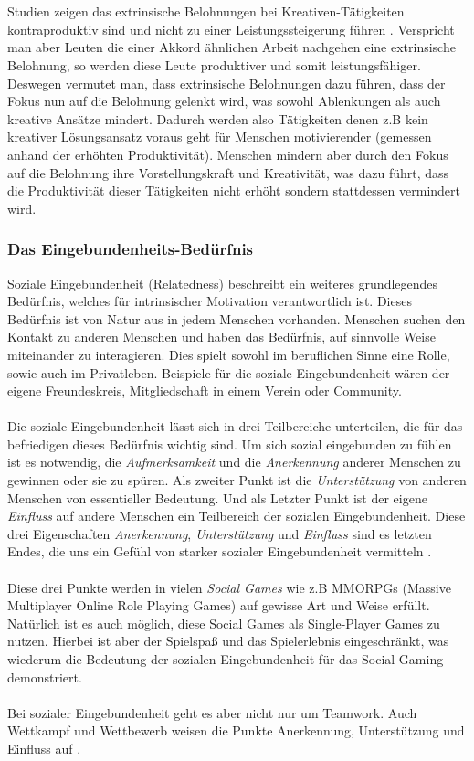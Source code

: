 \documentclass[a4paper,12pt]{scrartcl}
\begin{document}
\\\\
Studien zeigen das extrinsische Belohnungen bei Kreativen-Tätigkeiten kontraproduktiv sind und nicht zu einer Leistungssteigerung führen \cite{Pink2010}. Verspricht man aber Leuten die einer Akkord ähnlichen Arbeit nachgehen eine extrinsische Belohnung, so werden diese Leute produktiver und somit leistungsfähiger. Deswegen vermutet man, dass extrinsische Belohnungen dazu führen, dass der Fokus nun auf die Belohnung gelenkt wird, was sowohl Ablenkungen als auch kreative Ansätze mindert. Dadurch werden also Tätigkeiten denen z.B kein kreativer Lösungsansatz voraus geht für Menschen motivierender (gemessen anhand der erhöhten Produktivität). Menschen mindern aber durch den Fokus auf die Belohnung ihre Vorstellungskraft und Kreativität, was dazu führt, dass die Produktivität dieser Tätigkeiten nicht erhöht sondern stattdessen vermindert wird.

\subsubsection{Das Eingebundenheits-Bedürfnis}
Soziale Eingebundenheit (Relatedness) beschreibt ein weiteres grundlegendes Bedürfnis, welches für intrinsischer Motivation verantwortlich ist. Dieses Bedürfnis ist von Natur aus in jedem Menschen vorhanden. Menschen suchen den Kontakt zu anderen Menschen und haben das Bedürfnis, auf sinnvolle Weise miteinander zu interagieren. Dies spielt sowohl im beruflichen Sinne eine Rolle, sowie auch im Privatleben. Beispiele für die soziale Eingebundenheit wären der eigene Freundeskreis, Mitgliedschaft in einem Verein oder Community. 
\\\\
Die soziale Eingebundenheit lässt sich in drei Teilbereiche unterteilen, die für das befriedigen dieses Bedürfnis wichtig sind. Um sich sozial eingebunden zu fühlen ist es notwendig, die \textit{Aufmerksamkeit} und die \textit{Anerkennung} anderer Menschen zu gewinnen oder sie zu spüren. Als zweiter Punkt ist die \textit{Unterstützung} von anderen Menschen von essentieller Bedeutung. Und als Letzter Punkt ist der eigene \textit{Einfluss} auf andere Menschen ein Teilbereich der sozialen Eingebundenheit. Diese drei Eigenschaften \textit{Anerkennung}, \textit{Unterstützung} und \textit{Einfluss} sind es letzten Endes, die uns ein Gefühl von starker sozialer Eingebundenheit vermitteln \cite{Rigby2011}.
\\\\
Diese drei Punkte werden in vielen \textit{Social Games} wie z.B MMORPGs (Massive Multiplayer Online Role Playing Games) auf gewisse Art und Weise erfüllt. Natürlich ist es auch möglich, diese Social Games als Single-Player Games zu nutzen. Hierbei ist aber der Spielspaß und das Spielerlebnis eingeschränkt, was wiederum die Bedeutung der sozialen Eingebundenheit für das Social Gaming demonstriert.
\\\\
Bei sozialer Eingebundenheit geht es aber nicht nur um Teamwork. Auch Wettkampf und Wettbewerb weisen die Punkte Anerkennung, Unterstützung und Einfluss auf \cite{Rigby2011}.
\end{document}

